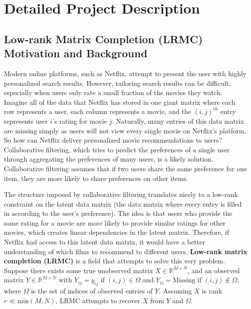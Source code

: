 \section{Detailed Project Description}
\subsection{{Low-rank Matrix Completion (LRMC) Motivation and Background}} Modern online platforms, such as Netflix, attempt to present the user with highly personalized search results. However, tailoring search results can be difficult, especially when users only rate a small fraction of the movies they watch. Imagine all of the data that Netflix has stored in one giant matrix where each row represents a user, each column represents a movie, and the $(i,j)^{th}$ entry represents user $i$'s rating for movie $j$. Naturally, many entries of this data matrix are missing simply as users will not view every single movie on Netflix's platform. So how can Netflix deliver personalized movie recommendations to users? Collaborative filtering, which tries to predict the preferences of a single user through aggregating the preferences of many users, is a likely solution. Collaborative filtering assumes that if two users share the same preference for one item, they are more likely to share preferences on other items.

The structure imposed by collaborative filtering translates nicely to a low-rank constraint on the latent data matrix (the data matrix where every entry is filled in according to the user's preference). The idea is that users who provide the same rating for a movie are more likely to provide similar ratings for other movies, which creates linear dependencies in the latent matrix. Therefore, if Netflix had access to this latent data matrix, it would have a better understanding of which films to recommend to different users. \textbf{Low-rank matrix completion (LRMC)} is a field that attempts to solve this very problem. Suppose there exists some true unobserved matrix $X \in \mathbb{R}^{M \times N}$, and an observed matrix $Y \in \mathbb{R}^{M \times N}$ with $Y_{ij} = y_{ij}$ if $(i,j) \in \Omega$ and $Y_{ij} = \text{Missing}$ if $(i,j) \notin \Omega$, where $\Omega$ is the set of indices of observed entries of $Y$. Assuming $X$ is rank $r \ll \text{min}(M, N)$, LRMC attempts to recover $X$ from $Y$ and $\Omega$.

